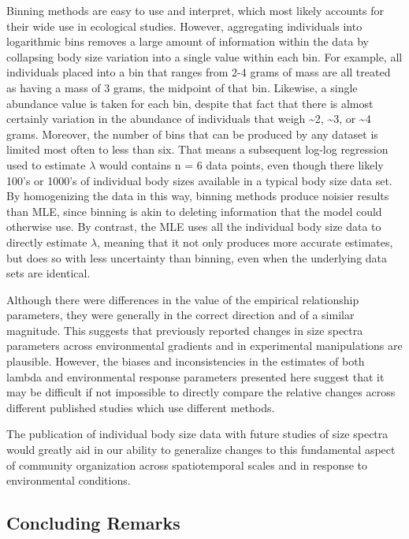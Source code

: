 \documentclass[
]{article}
\begin{document}
Binning methods are easy to use and interpret, which most likely
accounts for their wide use in ecological studies. However, aggregating
individuals into logarithmic bins removes a large amount of information
within the data by collapsing body size variation into a single value
within each bin. For example, all individuals placed into a bin that
ranges from 2-4 grams of mass are all treated as having a mass of 3
grams, the midpoint of that bin. Likewise, a single abundance value is
taken for each bin, despite that fact that there is almost certainly
variation in the abundance of individuals that weigh \textasciitilde2,
\textasciitilde3, or \textasciitilde4 grams. Moreover, the number of
bins that can be produced by any dataset is limited most often to less
than six. That means a subsequent log-log regression used to estimate
\(\lambda\) would contains n = 6 data points, even though there likely
100's or 1000's of individual body sizes available in a typical body
size data set. By homogenizing the data in this way, binning methods
produce noisier results than MLE, since binning is akin to deleting
information that the model could otherwise use. By contrast, the MLE
uses all the individual body size data to directly estimate \(\lambda\),
meaning that it not only produces more accurate estimates, but does so
with less uncertainty than binning, even when the underlying data sets
are identical.

Although there were differences in the value of the empirical
relationship parameters, they were generally in the correct direction
and of a similar magnitude. This suggests that previously reported
changes in size spectra parameters across environmental gradients and in
experimental manipulations are plausible. However, the biases and
inconsistencies in the estimates of both lambda and environmental
response parameters presented here suggest that it may be difficult if
not impossible to directly compare the relative changes across different
published studies which use different methods.

The publication of individual body size data with future studies of size
spectra would greatly aid in our ability to generalize changes to this
fundamental aspect of community organization across spatiotemporal
scales and in response to environmental conditions.

\hypertarget{concluding-remarks}{%
\subsection{Concluding Remarks}\label{concluding-remarks}}
\end{document}
